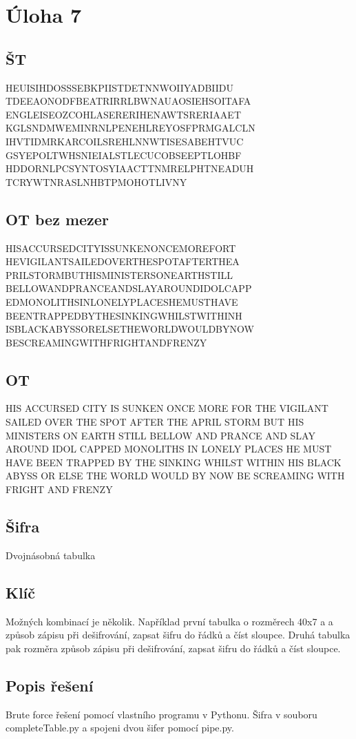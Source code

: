 \documentclass[12pt]{article} %
\begin{document}
\section{Úloha 7}
\subsection{ŠT}
HEUISIHDOSSSEBKPIISTDETNNWOIIYADBIIDU
TDEEAONODFBEATRIRRLBWNAUAOSIEHSOITAFA
ENGLEISEOZCOHLASERERIHENAWTSRERIAAET
KGLSNDMWEMINRNLPENEHLREYOSFPRMGALCLN
IHVTIDMRKARCOILSREHLNNWTISESABEHTVUC
GSYEPOLTWHSNIEIALSTLECUCOBSEEPTLOHBF
HDDORNLPCSYNTOSYIAACTTNMRELPHTNEADUH
TCRYWTNRASLNHBTPMOHOTLIVNY

\subsection{OT bez mezer}
HISACCURSEDCITYISSUNKENONCEMOREFORT
HEVIGILANTSAILEDOVERTHESPOTAFTERTHEA
PRILSTORMBUTHISMINISTERSONEARTHSTILL
BELLOWANDPRANCEANDSLAYAROUNDIDOLCAPP
EDMONOLITHSINLONELYPLACESHEMUSTHAVE
BEENTRAPPEDBYTHESINKINGWHILSTWITHINH
ISBLACKABYSSORELSETHEWORLDWOULDBYNOW
BESCREAMINGWITHFRIGHTANDFRENZY

\subsection{OT}
HIS ACCURSED CITY IS SUNKEN ONCE MORE
FOR THE VIGILANT SAILED OVER THE SPOT 
AFTER THE APRIL STORM BUT HIS MINISTERS
ON EARTH STILL BELLOW AND PRANCE AND 
SLAY AROUND IDOL CAPPED MONOLITHS IN 
LONELY PLACES HE MUST HAVE BEEN TRAPPED
BY THE SINKING WHILST WITHIN HIS BLACK
ABYSS OR ELSE THE WORLD WOULD BY NOW 
BE SCREAMING WITH FRIGHT AND FRENZY
\subsection{Šifra}
Dvojnásobná tabulka
\subsection{Klíč}
Možných kombinací je několik. Například první tabulka o rozměrech 40x7 a a způsob zápisu při dešifrování, zapsat šifru do řádků a číst sloupce. Druhá tabulka pak rozměra způsob zápisu při dešifrování, zapsat šifru do řádků a číst sloupce. 
\subsection{Popis řešení}
Brute force řešení pomocí vlastního programu v Pythonu. Šifra v souboru completeTable.py a spojeni dvou šifer pomocí pipe.py. 
\end{document}
